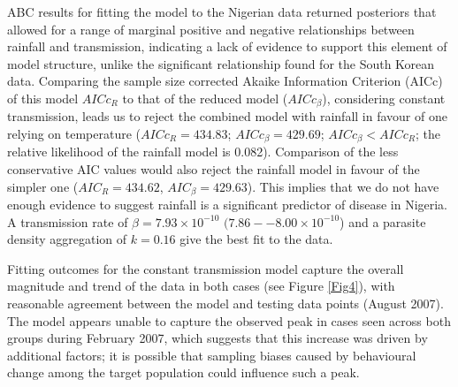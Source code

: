 ABC results for fitting the model to the Nigerian data returned posteriors that allowed for a range of marginal positive and negative relationships between rainfall and transmission, indicating a lack of evidence to support this element of model structure, unlike the significant relationship found for the South Korean data. Comparing the sample size corrected Akaike Information Criterion (AICc) of this model $AICc_{R}$ to that of the reduced model ($AICc_{\beta}$), considering constant transmission, leads us to reject the combined model with rainfall in favour of one relying on temperature ($AICc_{R}=434.83$; $AICc_{\beta}=429.69$; $AICc_{\beta}<AICc_{R}$; the relative likelihood of the rainfall model is 0.082). Comparison of the less conservative AIC values would also reject the rainfall model in favour of the simpler one ($AIC_{R}=434.62$, $AIC_{\beta}=429.63$). This implies that we do not have enough evidence to suggest rainfall is a significant predictor of disease in Nigeria. A transmission rate of $\beta=7.93\times10^{-10}$ $(7.86--8.00\times10^{-10}$) and a parasite density aggregation of $k=0.16$ give the best fit to the data.

Fitting outcomes for the constant transmission model capture the overall magnitude and trend of the data in both cases (see Figure \ref{Fig4}), with reasonable agreement between the model and testing data points (August 2007). The model appears unable to capture the observed peak in cases seen across both groups during February 2007, which suggests that this increase was driven by additional factors; it is possible that sampling biases caused by behavioural change among the target population could influence such a peak.

